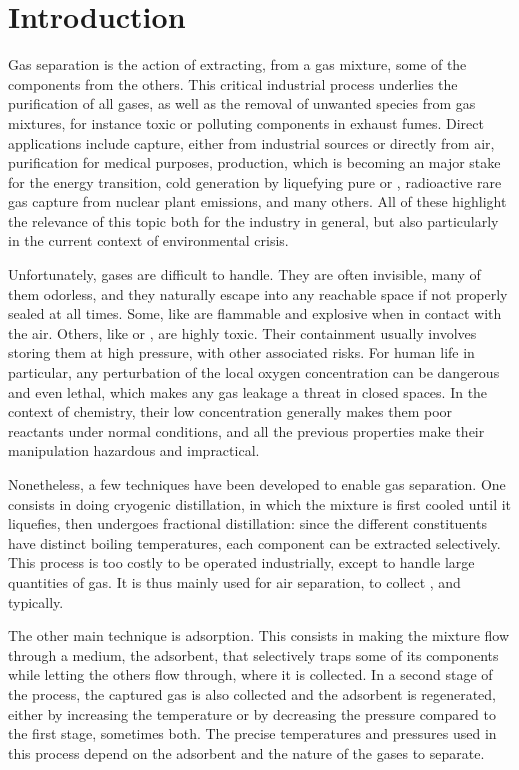 
\chapter*{Introduction}

Gas separation is the action of extracting, from a gas mixture, some of the components from the others. This critical industrial process underlies the purification of all gases, as well as the removal of unwanted species from gas mixtures, for instance toxic or polluting components in exhaust fumes. Direct applications include  capture, either from industrial sources or directly from air,  purification for medical purposes,  production, which is becoming an major stake for the energy transition, cold generation by liquefying pure  or , radioactive rare gas capture from nuclear plant emissions, and many others. All of these highlight the relevance of this topic both for the industry in general, but also particularly in the current context of environmental crisis.

Unfortunately, gases are difficult to handle. They are often invisible, many of them odorless, and they naturally escape into any reachable space if not properly sealed at all times. Some, like  are flammable and explosive when in contact with the air. Others, like  or , are highly toxic. Their containment usually involves storing them at high pressure, with other associated risks. For human life in particular, any perturbation of the local oxygen concentration can be dangerous and even lethal, which makes any gas leakage a threat in closed spaces. In the context of chemistry, their low concentration generally makes them poor reactants under normal conditions, and all the previous properties make their manipulation hazardous and impractical.

Nonetheless, a few techniques have been developed to enable gas separation. One consists in doing cryogenic distillation, in which the mixture is first cooled until it liquefies, then undergoes fractional distillation: since the different constituents have distinct boiling temperatures, each component can be extracted selectively. This process is too costly to be operated industrially, except to handle large quantities of gas. It is thus mainly used for air separation, to collect ,  and  typically.

The other main technique is adsorption. This consists in making the mixture flow through a medium, the adsorbent, that selectively traps some of its components while letting the others flow through, where it is collected. In a second stage of the process, the captured gas is also collected and the adsorbent is regenerated, either by increasing the temperature or by decreasing the pressure compared to the first stage, sometimes both. The precise temperatures and pressures used in this process depend on the adsorbent and the nature of the gases to separate.

